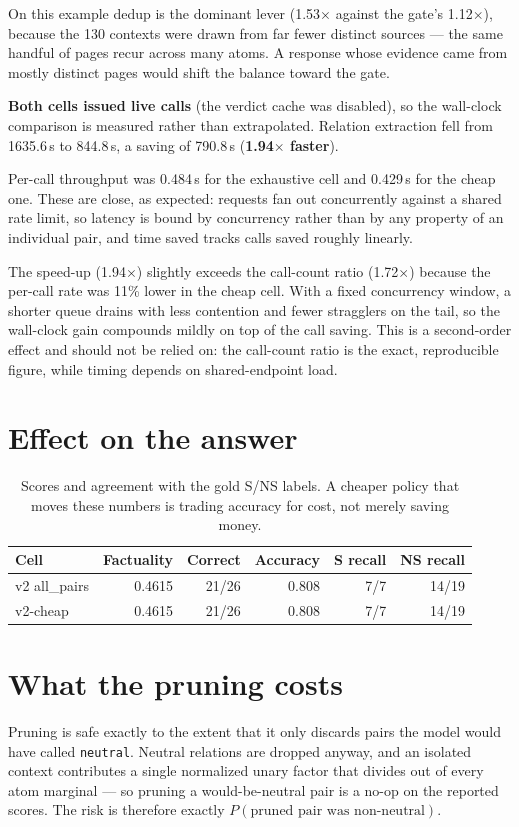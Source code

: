 \documentclass[11pt]{article}
\begin{document}
On this example dedup is the dominant lever (1.53$\times$ against the gate's 1.12$\times$), because the 130 contexts were drawn from far fewer distinct sources --- the same handful of pages recur across many atoms. A response whose evidence came from mostly distinct pages would shift the balance toward the gate.

\textbf{Both cells issued live calls} (the verdict cache was disabled), so the wall-clock comparison is measured rather than extrapolated. Relation extraction fell from 1635.6\,s to 844.8\,s, a saving of 790.8\,s (\textbf{1.94$\times$ faster}).

Per-call throughput was 0.484\,s for the exhaustive cell and 0.429\,s for the cheap one. These are close, as expected: requests fan out concurrently against a shared rate limit, so latency is bound by concurrency rather than by any property of an individual pair, and time saved tracks calls saved roughly linearly.

The speed-up (1.94$\times$) slightly exceeds the call-count ratio (1.72$\times$) because the per-call rate was 11\% lower in the cheap cell. With a fixed concurrency window, a shorter queue drains with less contention and fewer stragglers on the tail, so the wall-clock gain compounds mildly on top of the call saving. This is a second-order effect and should not be relied on: the call-count ratio is the exact, reproducible figure, while timing depends on shared-endpoint load.

\section{Effect on the answer}
\begin{table}[htbp]
\centering
\begin{tabular}{lrrrrr}
\toprule
Cell & Factuality & Correct & Accuracy & S recall & NS recall \\
\midrule
v2 all\_pairs & 0.4615 & 21/26 & 0.808 & 7/7 & 14/19 \\
v2-cheap & 0.4615 & 21/26 & 0.808 & 7/7 & 14/19 \\
\bottomrule
\end{tabular}
\caption{Scores and agreement with the gold S/NS labels. A cheaper policy that moves these numbers is trading accuracy for cost, not merely saving money.}
\label{tab:quality}
\end{table}
\section{What the pruning costs}
Pruning is safe exactly to the extent that it only discards pairs the model would have called \texttt{neutral}. Neutral relations are dropped anyway, and an isolated context contributes a single normalized unary factor that divides out of every atom marginal --- so pruning a would-be-neutral pair is a no-op on the reported scores. The risk is therefore exactly $P(\text{pruned pair was non-neutral})$.
\end{document}
